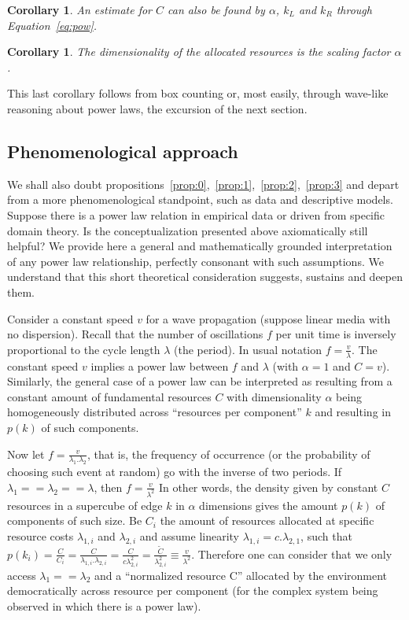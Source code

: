 \documentclass[a4paper, 11pt]{article} %
\newtheorem{corollary}[theorem]{Corollary}
\begin{document}
\begin{corollary}
	An estimate for $C$ can also be found by $\alpha$, $k_L$ and $k_R$ through Equation~\ref{eq:pow}.
\end{corollary}

\begin{corollary}
	The dimensionality of the allocated resources is the scaling factor $\alpha$.
\end{corollary}

This last corollary follows from box counting or, most easily,
through wave-like reasoning about power laws,
the excursion of the next section.

\subsection{Phenomenological approach}

We shall also
doubt propositions~\ref{prop:0},~\ref{prop:1},~\ref{prop:2},~\ref{prop:3}
and depart from a more phenomenological standpoint,
such as data and descriptive models.
Suppose there is a power law relation in empirical data
or driven from specific domain theory.
Is the conceptualization
presented above axiomatically still helpful?
We provide here a general and mathematically grounded
interpretation of any power law relationship,
perfectly consonant with such assumptions.
We understand that this short theoretical consideration
suggests, sustains and deepen them.

Consider a constant speed $v$ for a wave propagation
(suppose linear media with no dispersion).
Recall that the number of oscillations $f$ per unit time is
inversely proportional to the cycle length $\lambda$ (the period).
In usual notation $f=\frac{v}{\lambda}$.
The constant speed $v$ implies a power law between 
$f$ and $\lambda$ (with $\alpha=1$ and $C=v$).
Similarly, the general case of a power law can
be interpreted as resulting from a constant amount of
fundamental resources $C$ with dimensionality $\alpha$ 
being homogeneously distributed across
``resources per component'' $k$ and 
resulting in $p(k)$ of such components.

Now let $f=\frac{v}{\lambda_1 . \lambda_2}$, that is,
the frequency of occurrence
(or the probability of choosing such event at random) go with the inverse of two periods. 
If $\lambda_1==\lambda_2==\lambda$, then $f=\frac{v}{\lambda^2}$
In other words, the density given by constant $C$ 
resources in a supercube of
edge $k$ in $\alpha$ dimensions gives the amount $p(k)$ of components
of such size.
Be $C_i$ the amount of resources allocated at
specific resource costs $\lambda_{1,i}$ and $\lambda_{2,i}$
and assume
linearity $\lambda_{1,i}=c.\lambda_{2,1}$,
such that
$p(k_i)=\frac{C}{C_i}=\frac{C}{\lambda_{1,i}.\lambda_{2,i}}=
\frac{C}{c\lambda_{2,i}^2}=\frac{\widetilde{C}}{\lambda_{2,i}^2}\equiv\frac{v}{\lambda^2}$.
Therefore one can consider that we only access $\lambda_1==\lambda_2$ and a ``normalized resource C'' allocated by the environment democratically across resource per component (for the complex system being observed in which there is a power law).
\end{document}
